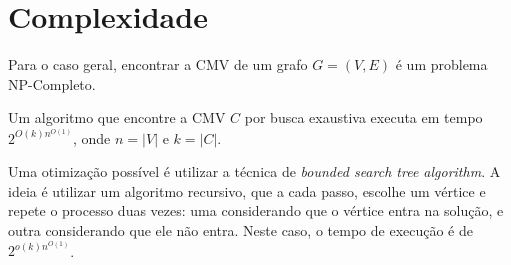 \section{Complexidade}
\label{sec:complexidade}

Para o caso geral, encontrar a CMV de um
grafo $G = (V, E)$ é um problema NP-Completo.

Um algoritmo que encontre a CMV $C$ por busca exaustiva executa em tempo
$2^{O(k)n^{O(1)}}$, onde $n = \left| V \right|$ e $k = \left| C
\right|$.

Uma otimização possível é utilizar a técnica de \textit{bounded search
tree algorithm}. A ideia é utilizar um algoritmo recursivo, que a cada
passo, escolhe um vértice e repete o processo duas vezes: uma
considerando que o vértice entra na solução, e outra considerando que
ele não entra. Neste caso, o tempo de execução é de
$2^{o(k)n^{O(1)}}$.
